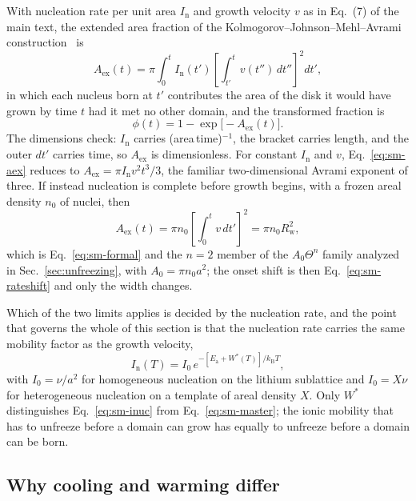 \documentclass[reprint,twocolumn,prb,amsmath,amssymb,superscriptaddress,floatfix]{revtex4-2}
\newcommand{\kB}{k_{\mathrm{B}}}
\newcommand{\Ea}{E_{\mathrm{a}}}
\begin{document}
With nucleation rate per unit area $I_{\mathrm{n}}$ and growth velocity $v$ as in Eq.~(7) of the
main text, the extended area fraction of the
Kolmogorov--Johnson--Mehl--Avrami construction~\cite{Kolmogorov1937,Johnson1939,Avrami1939,Avrami1940} is
\begin{equation}
  A_{\mathrm{ex}}(t)=\pi\int_{0}^{t}I_{\mathrm{n}}(t')
  \left[\int_{t'}^{t}v(t'')\,dt''\right]^{2}dt',
  \label{eq:sm-aex}
\end{equation}
in which each nucleus born at $t'$ contributes the area of the disk it would have grown by time
$t$ had it met no other domain, and the transformed fraction is
\begin{equation}
  \phi(t)=1-\exp\bigl[-A_{\mathrm{ex}}(t)\bigr].
  \label{eq:sm-kjma}
\end{equation}
The dimensions check: $I_{\mathrm{n}}$ carries (area\,time)$^{-1}$, the bracket carries length,
and the outer $dt'$ carries time, so $A_{\mathrm{ex}}$ is dimensionless. For constant
$I_{\mathrm{n}}$ and $v$, Eq.~\eqref{eq:sm-aex} reduces to
$A_{\mathrm{ex}}=\pi I_{\mathrm{n}}v^{2}t^{3}/3$, the familiar two-dimensional Avrami exponent
of three. If instead nucleation is complete before growth begins, with a frozen areal density
$n_{0}$ of nuclei, then
\begin{equation}
  A_{\mathrm{ex}}(t)=\pi n_{0}\left[\int_{0}^{t}v\,dt'\right]^{2}
  =\pi n_{0}R_{\mathrm{w}}^{2},
  \label{eq:sm-saturated}
\end{equation}
which is Eq.~\eqref{eq:sm-formal} and the $n=2$ member of the $A_{0}\Theta^{n}$ family analyzed
in Sec.~\ref{sec:unfreezing}, with $A_{0}=\pi n_{0}a^{2}$; the onset shift is then
Eq.~\eqref{eq:sm-rateshift} and only the width changes.

Which of the two limits applies is decided by the nucleation rate, and the point that governs
the whole of this section is that the nucleation rate carries the same mobility factor as the
growth velocity,
\begin{equation}
  I_{\mathrm{n}}(T) = I_{0}\,e^{-[\Ea+W^{*}(T)]/\kB T},
  \label{eq:sm-inuc}
\end{equation}
with $I_{0}=\nu/a^{2}$ for homogeneous nucleation on the lithium sublattice and $I_{0}=X\nu$
for heterogeneous nucleation on a template of areal density $X$. Only $W^{*}$ distinguishes
Eq.~\eqref{eq:sm-inuc} from Eq.~\eqref{eq:sm-master}; the ionic mobility that has to unfreeze
before a domain can grow has equally to unfreeze before a domain can be born.

\subsection{Why cooling and warming differ}
\end{document}
